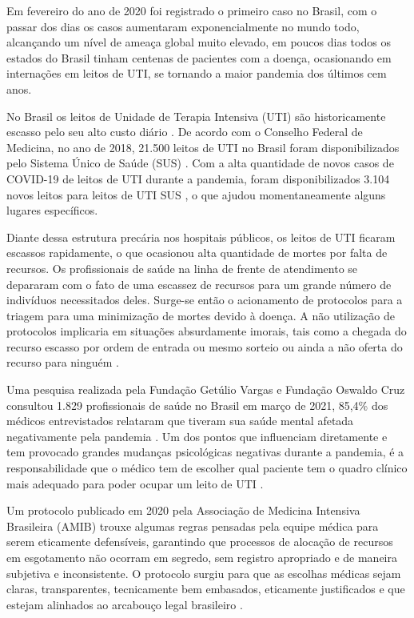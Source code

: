 \documentclass[12pt]{article}
\begin{document}
Em fevereiro do ano de 2020 foi registrado o primeiro caso no Brasil, com o passar dos dias os casos aumentaram exponencialmente no mundo todo, alcançando um nível de ameaça global muito elevado, em poucos dias todos os estados do Brasil tinham centenas de pacientes com a doença, ocasionando em internações em leitos de UTI, se tornando a maior pandemia dos últimos cem anos.

No Brasil os leitos de Unidade de Terapia Intensiva (UTI)  são historicamente escasso pelo seu alto custo diário \cite{murthy2015intensive}. De acordo com o Conselho Federal de Medicina, no ano de 2018, 21.500 leitos de UTI no Brasil foram disponibilizados pelo Sistema Único de Saúde (SUS) \cite{cfm2018,cfm2020}. Com a alta quantidade de novos casos de COVID-19 de leitos de UTI durante a pandemia, foram disponibilizados 3.104 novos leitos para leitos de UTI SUS \cite{cotrim2020crescimento}, o que ajudou momentaneamente alguns lugares específicos.

Diante dessa estrutura precária nos hospitais públicos, os leitos de UTI  ficaram escassos rapidamente, o que ocasionou alta quantidade de mortes por falta de recursos. Os profissionais de saúde na linha de frente de atendimento se depararam com o fato de uma escassez de recursos para um grande número de indivíduos necessitados deles. Surge-se então o acionamento de protocolos para a triagem para uma minimização de mortes devido à doença. A não utilização de protocolos implicaria em situações absurdamente imorais, tais como a chegada do recurso escasso por ordem de entrada ou mesmo sorteio ou ainda a não oferta do recurso para ninguém \cite{costa2020protocolos}.

Uma pesquisa realizada pela Fundação Getúlio Vargas e Fundação Oswaldo Cruz consultou 1.829 profissionais de saúde no Brasil em março de 2021, 85,4\% dos médicos entrevistados relataram que tiveram sua saúde mental afetada negativamente pela pandemia \cite{paulomotoryn2021}. Um dos pontos que influenciam diretamente e tem provocado grandes mudanças psicológicas negativas durante a pandemia, é a responsabilidade que o médico tem de escolher qual paciente tem o quadro clínico mais adequado para poder ocupar um leito de UTI \cite{teixeira2020processo}.

Um protocolo publicado em 2020 pela Associação de Medicina Intensiva Brasileira (AMIB) trouxe algumas regras pensadas pela equipe médica para serem eticamente defensíveis, garantindo que processos de alocação de recursos em esgotamento não ocorram em segredo, sem registro apropriado e de maneira subjetiva e inconsistente. O protocolo surgiu para que as escolhas médicas sejam claras, transparentes, tecnicamente bem embasados, eticamente justificados e que estejam alinhados ao arcabouço legal brasileiro \cite{kretzer2020protocolo}.
\end{document}
